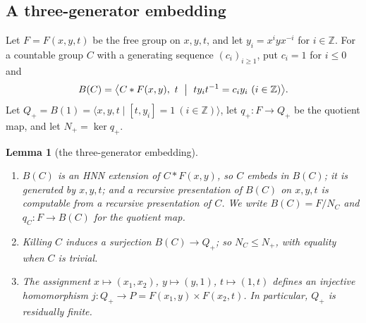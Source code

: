\documentclass[11pt]{amsart}
\newtheorem{lemma}[theorem]{Lemma}
\theoremstyle{remark}
\theoremstyle{plain}
\begin{document}
\subsection*{A three-generator embedding}

Let $F=F(x,y,t)$ be the free group on $x,y,t$, and let
$y_i=x^iyx^{-i}$ for $i\in\mathbb Z$.  For a countable group $C$ with a
generating sequence $(c_i)_{i\ge1}$, put $c_i=1$ for $i\le0$ and
\begin{equation}\label{eq:bridge}
 B(C)=\bigl\langle C*F(x,y),\ t\ \bigm|\ ty_it^{-1}=c_iy_i\ (i\in\mathbb Z)\bigr\rangle.
\end{equation}
Let $Q_+=B(1)=\langle x,y,t\mid[t,y_i]=1\ (i\in\mathbb Z)\rangle$, let
$q_+\colon F\to Q_+$ be the quotient map, and let $N_+=\ker q_+$.

\begin{lemma}[the three-generator embedding]\label{lem:bridge}
\begin{enumerate}
\item $B(C)$ is an HNN extension of $C*F(x,y)$, so $C$ embeds in $B(C)$;
it is generated by $x,y,t$; and a recursive presentation of $B(C)$ on
$x,y,t$ is computable from a recursive presentation of $C$.  We write
$B(C)=F/N_C$ and $q_C\colon F\to B(C)$ for the quotient map.
\item Killing $C$ induces a surjection $B(C)\to Q_+$; so
$N_C\le N_+$, with equality when $C$ is trivial.
\item The assignment $x\mapsto(x_1,x_2)$, $y\mapsto(y,1)$, $t\mapsto(1,t)$
defines an injective homomorphism $j\colon Q_+\to P=F(x_1,y)\times F(x_2,t)$.
In particular, $Q_+$ is residually finite.
\end{enumerate}
\end{lemma}
\end{document}
